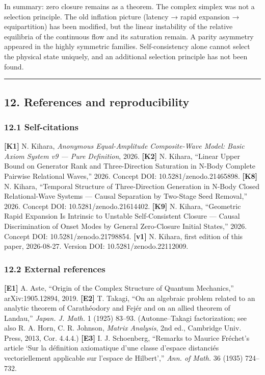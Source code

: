\documentclass[
  10pt,
  a4paper,
]{article}
\begin{document}
In summary: zero closure remains as a theorem. The complex simplex was
not a selection principle. The old inflation picture (latency → rapid
expansion → equipartition) has been modified, but the linear instability
of the relative equilibria of the continuous flow and its saturation
remain. A parity asymmetry appeared in the highly symmetric families.
Self-consistency alone cannot select the physical state uniquely, and an
additional selection principle has not been found.

\begin{center}\rule{0.5\linewidth}{0.5pt}\end{center}

\subsection{12. References and
reproducibility}\label{references-and-reproducibility}

\subsubsection{12.1 Self-citations}\label{self-citations}

\textbf{{[}K1{]}} N. Kihara, \emph{Anonymous Equal-Amplitude
Composite-Wave Model: Basic Axiom System v9 --- Pure Definition}, 2026.
\textbf{{[}K2{]}} N. Kihara, ``Linear Upper Bound on Generator Rank and
Three-Direction Saturation in N-Body Complete Pairwise Relational
Waves,'' 2026. Concept DOI: 10.5281/zenodo.21465898. \textbf{{[}K8{]}}
N. Kihara, ``Temporal Structure of Three-Direction Generation in N-Body
Closed Relational-Wave Systems --- Causal Separation by Two-Stage Seed
Removal,'' 2026. Concept DOI: 10.5281/zenodo.21614402. \textbf{{[}K9{]}}
N. Kihara, ``Geometric Rapid Expansion Is Intrinsic to Unstable
Self-Consistent Closure --- Causal Discrimination of Onset Modes by
General Zero-Closure Initial States,'' 2026. Concept DOI:
10.5281/zenodo.21798854. \textbf{{[}v1{]}} N. Kihara, first edition of
this paper, 2026-08-27. Version DOI: 10.5281/zenodo.22112009.

\subsubsection{12.2 External references}\label{external-references}

\textbf{{[}E1{]}} A. Aste, ``Origin of the Complex Structure of Quantum
Mechanics,'' arXiv:1905.12894, 2019. \textbf{{[}E2{]}} T. Takagi, ``On
an algebraic problem related to an analytic theorem of Carathéodory and
Fejér and on an allied theorem of Landau,'' \emph{Japan. J. Math.} 1
(1925) 83--93. (Autonne--Takagi factorization; see also R. A. Horn, C.
R. Johnson, \emph{Matrix Analysis}, 2nd ed., Cambridge Univ. Press,
2013, Cor. 4.4.4.) \textbf{{[}E3{]}} I. J. Schoenberg, ``Remarks to
Maurice Fréchet's article `Sur la définition axiomatique d'une classe
d'espace distanciés vectoriellement applicable sur l'espace de
Hilbert','' \emph{Ann. of Math.} 36 (1935) 724--732.
\end{document}

